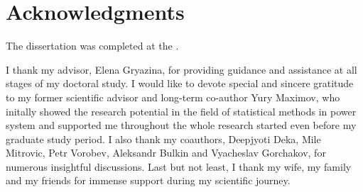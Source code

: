 
\newpage

\section*{Acknowledgments} 
The dissertation was completed at the {\thesisOrganizationEn}.

I thank my advisor, Elena Gryazina, for providing guidance and assistance at all stages of my doctoral study. I would like to devote special and sincere gratitude to my former scientific advisor and long-term co-author Yury Maximov, who initally showed the research potential in the field of statistical methods in power system and supported me throughout the whole research started even before my graduate study period. I also thank my coauthors, Deepjyoti Deka, Mile Mitrovic, Petr Vorobev, Aleksandr Bulkin and Vyacheslav Gorchakov, for numerous insightful discussions. Last but not least, I thank my wife, my family and my friends for immense support during my scientific journey.


